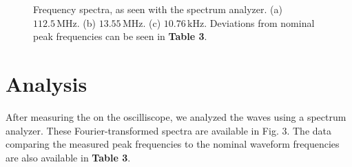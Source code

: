 \documentclass[lettersize,journal]{IEEEtran}
\begin{document}
\begin{figure}[!t]
\centering
{}
\hfil
{}
\hfil
{}
\caption{Frequency spectra, as seen with the spectrum analyzer. (a) $112.5 \,\text{MHz}$. (b) $13.55 \, \text{MHz}$. (c) $10.76 \, \text{kHz}$. Deviations from nominal peak frequencies can be seen in {\bf{Table 3}}.}
\label{fig_sim}
\end{figure}

\section{Analysis}

After measuring the on the oscilliscope, we analyzed the waves using a spectrum analyzer. These Fourier-transformed spectra are available in Fig. 3.
The data comparing the measured peak frequencies to the nominal waveform frequencies are also available in {\bf{Table 3}}.
\end{document}
